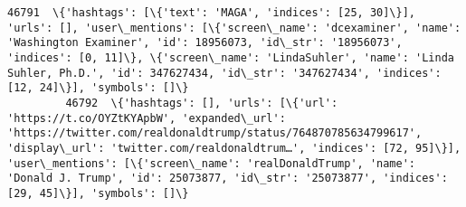 \documentclass[11pt]{article}
\begin{document}
\begin{Verbatim}[commandchars=\\\{\}]
         46791  \{'hashtags': [\{'text': 'MAGA', 'indices': [25, 30]\}], 'urls': [], 'user\_mentions': [\{'screen\_name': 'dcexaminer', 'name': 'Washington Examiner', 'id': 18956073, 'id\_str': '18956073', 'indices': [0, 11]\}, \{'screen\_name': 'LindaSuhler', 'name': 'Linda Suhler, Ph.D.', 'id': 347627434, 'id\_str': '347627434', 'indices': [12, 24]\}], 'symbols': []\}                                                                                                                                                                                                                                                                                                                                                                                                                                                                                                                                                                                                                                                                                                                                                                                                                                                        
         46792  \{'hashtags': [], 'urls': [\{'url': 'https://t.co/OYZtKYApbW', 'expanded\_url': 'https://twitter.com/realdonaldtrump/status/764870785634799617', 'display\_url': 'twitter.com/realdonaldtrum…', 'indices': [72, 95]\}], 'user\_mentions': [\{'screen\_name': 'realDonaldTrump', 'name': 'Donald J. Trump', 'id': 25073877, 'id\_str': '25073877', 'indices': [29, 45]\}], 'symbols': []\}                                                                                                                                                                                                                                                                                                                                                                                                                                                                                                                                                                                                                                                                                                                                                                                                                                 

\end{Verbatim}
\end{document}
